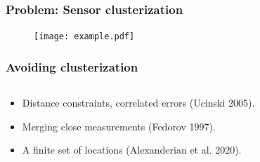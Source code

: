 \documentclass{beamer}
\begin{document}
\begin{frame}
\frametitle{Problem: Sensor clusterization}
\begin{figure}
    \centering
    \texttt{[image: example.pdf]}
\end{figure}

\end{frame}

\begin{frame}
  \frametitle{Avoiding clusterization}

  \begin{columns}
    \begin{column}{0.6\textwidth}
      \begin{itemize}
      \item<1> Distance constraints, correlated errors (Ucinski 2005).
      \item<2> Merging close measurements (Fedorov 1997).
      \item<3> A finite set of locations (Alexanderian et al. 2020).
      \end{itemize}
    \end{column}
    \begin{column}{0.55\textwidth}

\end{column}
\end{columns}
\end{frame}
\end{document}
